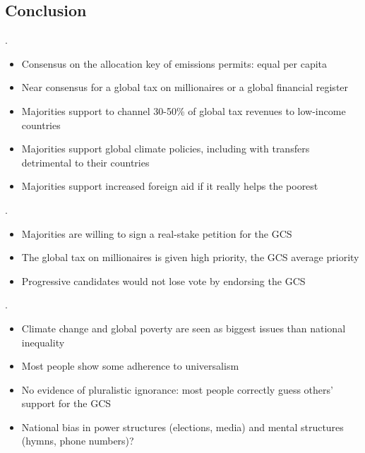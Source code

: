 \begin{framefont}{\small}
\section{Conclusion} 

\begin{frame}{} %
\begin{itemize}
.  
	\begin{itemize}
		\item Consensus on the allocation key of emissions permits: equal per capita
        \item Near consensus for a global tax on millionaires or a global financial register
		\item Majorities support to channel 30-50\% of global tax revenues to low-income countries
		\item Majorities support global climate policies, including with transfers detrimental to their countries
		\item Majorities support increased foreign aid if it really helps the poorest
    \end{itemize}
\pause
{}.  
	\begin{itemize}
		\item Majorities are willing to sign a real-stake petition for the GCS
		\item The global tax on millionaires is given high priority, the GCS average priority
		\item Progressive candidates would not lose vote by endorsing the GCS
	\end{itemize}
\pause
{}.  \textit{}
	\begin{itemize}
		\item Climate change and global poverty are seen as biggest issues than national inequality
		\item Most people show some adherence to universalism
		\item No evidence of pluralistic ignorance: most people correctly guess others' support for the GCS
	\end{itemize} \pause
\ip {}
    \begin{itemize}
        \item National bias in power structures (elections, media) and mental structures (hymns, phone numbers)? %

\end{itemize}
\end{itemize}
\end{frame}
\end{framefont}
